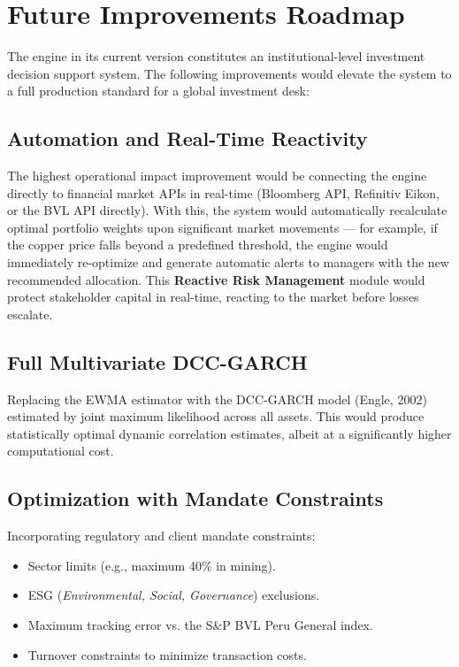 \documentclass[11pt,a4paper]{article}
\begin{document}
\section{Future Improvements Roadmap}

The engine in its current version constitutes an institutional-level investment decision
support system. The following improvements would elevate the system to a full production
standard for a global investment desk:

\subsection{Automation and Real-Time Reactivity}

The highest operational impact improvement would be connecting the engine directly to
financial market APIs in real-time (Bloomberg API, Refinitiv Eikon, or the BVL API directly).
With this, the system would automatically recalculate optimal portfolio weights upon
significant market movements — for example, if the copper price falls beyond a predefined
threshold, the engine would immediately re-optimize and generate automatic alerts to managers
with the new recommended allocation. This \textbf{Reactive Risk Management} module would
protect stakeholder capital in real-time, reacting to the market before losses escalate.

\subsection{Full Multivariate DCC-GARCH}

Replacing the EWMA estimator with the DCC-GARCH model (Engle, 2002) estimated by
joint maximum likelihood across all assets. This would produce statistically optimal
dynamic correlation estimates, albeit at a significantly higher computational cost.

\subsection{Optimization with Mandate Constraints}

Incorporating regulatory and client mandate constraints:
\begin{itemize}[leftmargin=*]
    \item Sector limits (e.g., maximum 40\% in mining).
    \item ESG (\textit{Environmental, Social, Governance}) exclusions.
    \item Maximum tracking error vs. the S\&P BVL Peru General index.
    \item Turnover constraints to minimize transaction costs.
\end{itemize}
\end{document}
